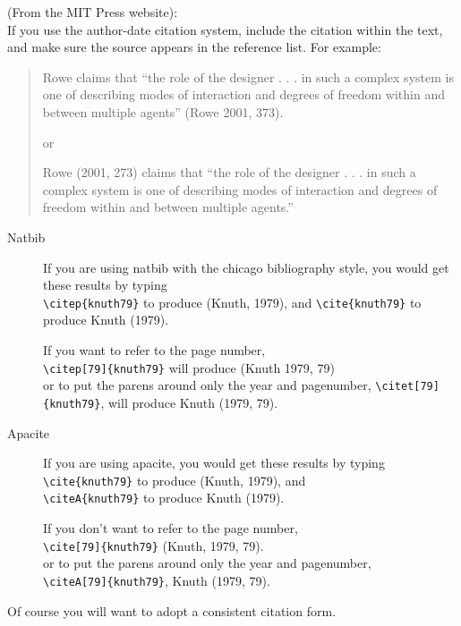 \documentclass{mitpress}
\begin{document}
(From the MIT Press website):\\
If you use the author-date citation system, include the citation within the text, and make sure the source appears in the reference list. For example:

\begin{quote}
Rowe claims that ``the role of the designer . . . in such a complex system is one of describing modes of interaction and degrees of freedom within and between multiple agents'' (Rowe 2001, 373).

\noindent
or

Rowe (2001, 273) claims that ``the role of the designer . . . in such a complex system is one of describing modes of interaction and degrees of freedom within and between multiple agents.''
\end{quote}

\begin{description}
\item[Natbib]
If you are using natbib with the chicago bibliography style, 
you would get these results by typing\\
\verb+\citep{knuth79}+ to produce (Knuth, 1979), and
\verb+\cite{knuth79}+ to produce Knuth (1979).

If you want to refer to the page number,\\ 
\verb+\citep[79]{knuth79}+ will produce (Knuth 1979, 79)\\
or to put the parens around only the year
and pagenumber, \verb+\citet[79]{knuth79}+, will produce Knuth (1979, 79).



\item[Apacite]
If you are using apacite, you would get these results by typing\\
\verb+\cite{knuth79}+ to produce (Knuth, 1979), and\\
\verb+\citeA{knuth79}+ to produce Knuth (1979).

If you don't want to refer to the page number,\\
\verb+\cite[79]{knuth79}+ (Knuth, 1979, 79).\\
or to put the parens around only the year
and pagenumber,\\ 
\verb+\citeA[79]{knuth79}+, Knuth (1979, 79).

\end{description}




Of course you will want to adopt a consistent citation form.
\end{document}
